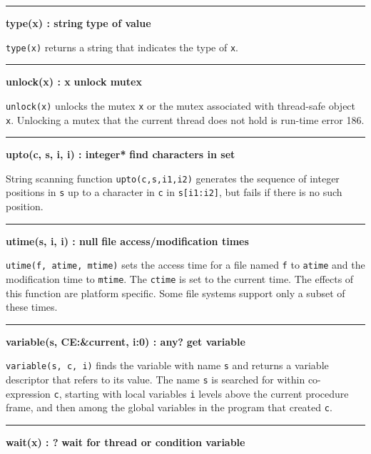 \bigskip\hrule\vspace{0.1cm}
\noindent
{\bf type(x) : string } \hfill {\bf type of value}

\noindent
{}\texttt{type(x)} returns a string that indicates the type
of \texttt{x}.

\bigskip\hrule\vspace{0.1cm}
\noindent
{\bf unlock(x) : x } \hfill {\bf unlock mutex}

\noindent
{}\texttt{unlock(x)} unlocks the mutex \texttt{x} or the mutex
associated with thread-safe object \texttt{x}. Unlocking a mutex that the
current thread does not hold is run-time error 186.

\bigskip\hrule\vspace{0.1cm}
\noindent
{\bf upto(c, s, i, i) : integer* } \hfill {\bf find characters in set}

\noindent
String scanning function \texttt{upto(c,s,i1,i2)}
generates the sequence of integer positions in \texttt{s} up to a
character in \texttt{c} in \texttt{s[i1:i2]}, but fails if there is no
such position.

\bigskip\hrule\vspace{0.1cm}
\noindent
{\bf utime(s, i, i) : null } \hfill {\bf file access/modification times}

\noindent
\texttt{utime(f, atime, mtime)} sets the access
time for a file named \texttt{f} to \texttt{atime} and the modification
time to \texttt{mtime}. The \texttt{ctime} is set to the current time.
The effects of this function are platform specific. Some file systems
support only a subset of these times.

\bigskip\hrule\vspace{0.1cm}
\noindent
{\bf variable(s, CE:\&current, i:0) : any? } \hfill {\bf get variable}

\noindent
{}\texttt{variable(s, c, i)} finds the variable
with name \texttt{s} and returns a variable descriptor that refers to
its value. The name \texttt{s} is searched for within co-expression
\texttt{c}, starting with local variables \texttt{i} levels above the
current procedure frame, and then among the global variables in the
program that created \texttt{c}.

\bigskip\hrule\vspace{0.1cm}
\noindent
{\bf wait(x) : ? } \hfill {\bf wait for thread or condition variable}

